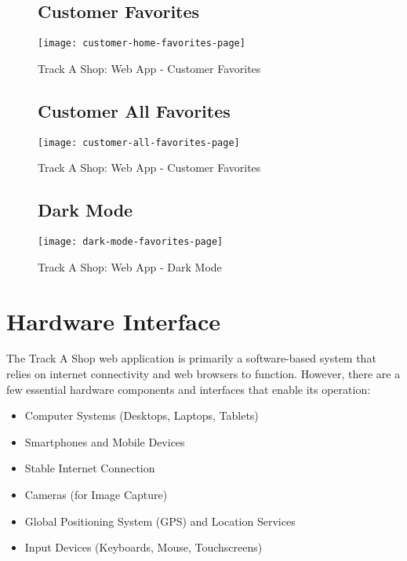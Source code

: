 \begin{figure}[h]
	\subsection{Customer Favorites \\}
	\centering
	\texttt{[image: customer-home-favorites-page]}
	\caption{Track A Shop: Web App - Customer Favorites}
\end{figure}
\pagebreak
\begin{figure}[h]
	\subsection{Customer All Favorites}
	\centering
	\texttt{[image: customer-all-favorites-page]}
	\caption{Track A Shop: Web App - Customer Favorites}
\end{figure}


\begin{figure}[h]
	\subsection{Dark Mode }
	\centering
	\texttt{[image: dark-mode-favorites-page]}
	\caption{Track A Shop: Web App - Dark Mode}
\end{figure}

\pagebreak
\section{Hardware Interface}
The Track A Shop web application is primarily a software-based system that relies on internet connectivity and web browsers to function. However, there are a few essential hardware components and interfaces that enable its operation:

\begin{itemize}
	\item Computer Systems (Desktops, Laptops, Tablets)
	\item Smartphones and Mobile Devices
	\item Stable Internet Connection
	\item Cameras (for Image Capture)
	\item Global Positioning System (GPS) and Location Services
	\item Input Devices (Keyboards, Mouse, Touchscreens)
\end{itemize}

